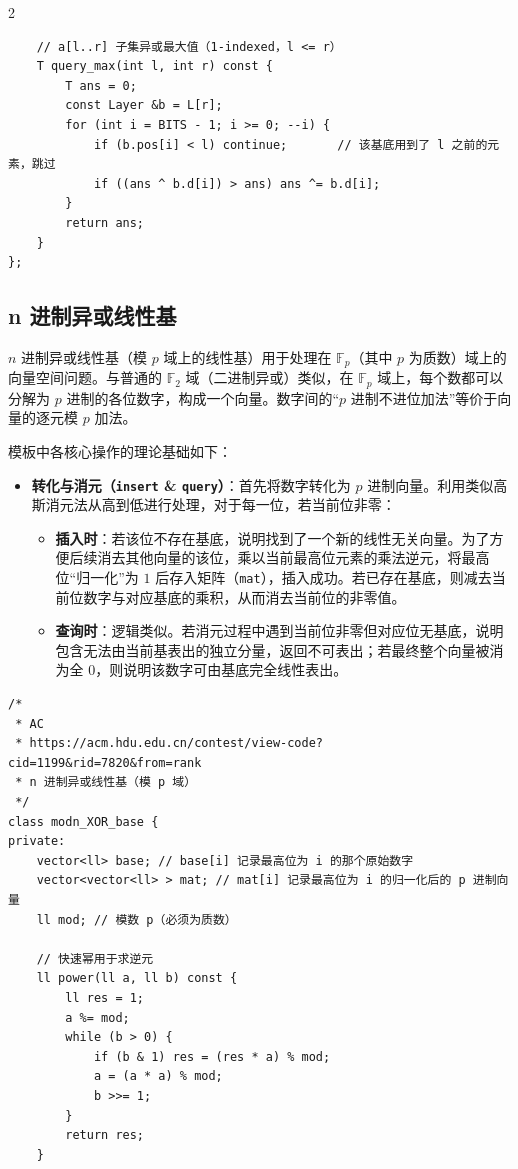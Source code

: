 \begin{multicols*}{2}
\begin{verbatim}
	// a[l..r] 子集异或最大值（1-indexed，l <= r）
	T query_max(int l, int r) const {
		T ans = 0;
		const Layer &b = L[r];
		for (int i = BITS - 1; i >= 0; --i) {
			if (b.pos[i] < l) continue;       // 该基底用到了 l 之前的元素，跳过
			if ((ans ^ b.d[i]) > ans) ans ^= b.d[i];
		}
		return ans;
	}
};
		\end{verbatim}

		\subsection{n 进制异或线性基}

		$n$ 进制异或线性基（模 $p$ 域上的线性基）用于处理在 $\mathbb{F}_p$（其中 $p$ 为质数）域上的向量空间问题。与普通的 $\mathbb{F}_2$ 域（二进制异或）类似，在 $\mathbb{F}_p$ 域上，每个数都可以分解为 $p$ 进制的各位数字，构成一个向量。数字间的“$p$ 进制不进位加法”等价于向量的逐元模 $p$ 加法。

		模板中各核心操作的理论基础如下：
		\begin{itemize}
			\item \textbf{转化与消元（\texttt{insert} \& \texttt{query}）}：首先将数字转化为 $p$ 进制向量。利用类似高斯消元法从高到低进行处理，对于每一位，若当前位非零：
			\begin{itemize}
				\item \textbf{插入时}：若该位不存在基底，说明找到了一个新的线性无关向量。为了方便后续消去其他向量的该位，乘以当前最高位元素的乘法逆元，将最高位“归一化”为 $1$ 后存入矩阵（\texttt{mat}），插入成功。若已存在基底，则减去当前位数字与对应基底的乘积，从而消去当前位的非零值。
				\item \textbf{查询时}：逻辑类似。若消元过程中遇到当前位非零但对应位无基底，说明包含无法由当前基表出的独立分量，返回不可表出；若最终整个向量被消为全 $0$，则说明该数字可由基底完全线性表出。
			\end{itemize}
		\end{itemize}

		\begin{verbatim}
/*
 * AC
 * https://acm.hdu.edu.cn/contest/view-code?cid=1199&rid=7820&from=rank
 * n 进制异或线性基（模 p 域）
 */
class modn_XOR_base {
private:
	vector<ll> base; // base[i] 记录最高位为 i 的那个原始数字
	vector<vector<ll> > mat; // mat[i] 记录最高位为 i 的归一化后的 p 进制向量
	ll mod; // 模数 p（必须为质数）

	// 快速幂用于求逆元
	ll power(ll a, ll b) const {
		ll res = 1;
		a %= mod;
		while (b > 0) {
			if (b & 1) res = (res * a) % mod;
			a = (a * a) % mod;
			b >>= 1;
		}
		return res;
	}


\end{verbatim}
\end{multicols*}
